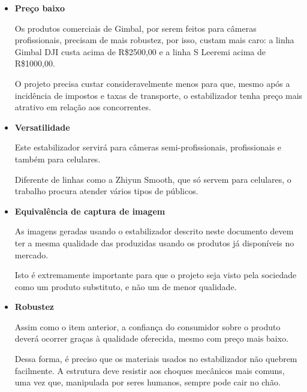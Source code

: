 \begin{itemize}
    \item \textbf{Preço baixo}
        
    Os produtos comerciais de Gimbal, por serem feitos para câmeras profissionais, precisam de mais robustez, por isso, custam mais caro: a linha Gimbal DJI custa acima de R\$2500,00 e a linha S Leeremi acima de R\$1000,00.
        
    O projeto precisa custar consideravelmente menos para que, mesmo após a incidência de impostos e taxas de transporte, o estabilizador tenha preço mais atrativo em relação aos concorrentes.
        
    \item \textbf{Versatilidade}
    
    Este estabilizador servirá para câmeras semi-profissionais, profissionais e também para celulares.
    
    Diferente de linhas como a Zhiyun Smooth, que só servem para celulares, o trabalho procura atender vários tipos de públicos.
    
    
    \item \textbf{Equivalência de captura de imagem}
    
    As imagens geradas usando o estabilizador descrito neste documento devem ter a mesma qualidade das produzidas usando os produtos já disponíveis no mercado.
    
    Isto é extremamente importante para que o projeto seja visto pela sociedade como um produto substituto, e não um de menor qualidade.
    
    
    \item \textbf{Robustez}
    
    Assim como o item anterior, a confiança do consumidor sobre o produto deverá ocorrer graças à qualidade oferecida, mesmo com preço mais baixo.
    
    Dessa forma, é preciso que os materiais usados no estabilizador não quebrem facilmente. A estrutura deve resistir aos choques mecânicos mais comuns, uma vez que, manipulada por seres humanos, sempre pode cair no chão.
\end{itemize}





